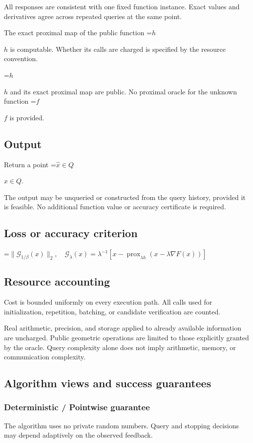\documentclass[10pt,a4paper]{article}
\newcommand{\AtlasMath}[1]{\par\begingroup\centering\setbox0=\hbox{$\displaystyle #1$}\ifdim\wd0>1.4\linewidth\typeout{ATLAS WIDE FORMULA: \the\wd0}\fi\ifdim\wd0>\linewidth\resizebox{\linewidth}{!}{\box0}\else\box0\fi\par\endgroup}
\newcommand{\AtlasInlineMath}[1]{\begingroup\setbox0=\hbox{$#1$}\ifdim\wd0>.4\linewidth\endgroup\AtlasMath{#1}\else\endgroup$#1$\fi}
\begin{document}
All responses are consistent with one fixed function instance. Exact values and derivatives agree across repeated queries at the same point.

The exact proximal map of the public function \AtlasInlineMath{h} is computable. Whether its calls are charged is specified by the resource convention.

\AtlasInlineMath{h} and its exact proximal map are public. No proximal oracle for the unknown function \AtlasInlineMath{f} is provided.

\subsection{Output}
Return a point \AtlasInlineMath{\widehat x\in Q}.

The output may be unqueried or constructed from the query history, provided it is feasible. No additional function value or accuracy certificate is required.

\subsection{Loss or accuracy criterion}

\AtlasMath{\|\mathcal{G}_{1/\beta}(x)\|_2,\quad\mathcal{G}_\lambda(x)=\lambda^{-1}[x-\operatorname{prox}_{\lambda h}(x-\lambda\nabla F(x))]}


\subsection{Resource accounting}
Cost is bounded uniformly on every execution path. All calls used for initialization, repetition, batching, or candidate verification are counted.

Real arithmetic, precision, and storage applied to already available information are uncharged. Public geometric operations are limited to those explicitly granted by the oracle. Query complexity alone does not imply arithmetic, memory, or communication complexity.

\subsection{Algorithm views and success guarantees}
\subsubsection{Deterministic / Pointwise guarantee}
The algorithm uses no private random numbers. Query and stopping decisions may depend adaptively on the observed feedback.
\end{document}
